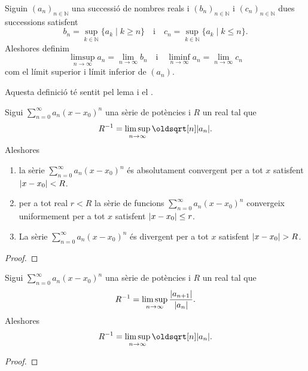 \documentclass[../Apunts.tex]{subfiles}
\begin{document}
	\begin{definition}
		\label{def:límit superior d'una successió}
		\label{def:límit inferior d'una successió}
		Siguin \((a_{n})_{n\in\mathbb{N}}\) una successió de nombres reals i \((b_{n})_{n\in\mathbb{N}}\) i \((c_{n})_{n\in\mathbb{N}}\) dues successions satisfent
		\[b_{n}=\sup_{k\in\mathbb{N}}\{a_{k}\mid k\geq n\}\quad\text{i}\quad c_{n}=\sup_{k\in\mathbb{N}}\{a_{k}\mid k\leq n\}.\]
		Aleshores definim
		\[\limsup_{n\to\infty}a_{n}=\lim_{n\to\infty}b_{n}\quad\text{i}\quad\liminf_{n\to\infty}a_{n}=\lim_{n\to\infty}c_{n}\]
		com el límit superior i límit inferior de \((a_{n})\).
		
		Aquesta definició té sentit pel lema  i el \corollari{} .
	\end{definition}
	\begin{theorem}
		\label{thm:radi de convergència d'una sèrie de potències}
		Sigui \(\sum_{n=0}^{\infty}a_{n}(x-x_{0})^{n}\) una sèrie de potències i \(R\) un real tal que
		\[R^{-1}=\limsup_{n\to\infty}\sqrt[n]{\abs{a_{n}}}.\]
		Aleshores
		\begin{enumerate}
			\item\label{thm:radi de convergència d'una sèrie de potències:enum1} la sèrie \(\sum_{n=0}^{\infty}a_{n}(x-x_{0})^{n}\) és absolutament convergent per a tot \(x\) satisfent \(\abs{x-x_{0}}<R\).
			\item\label{thm:radi de convergència d'una sèrie de potències:enum2} per a tot real \(r<R\) la sèrie de funcions \(\sum_{n=0}^{\infty}a_{n}(x-x_{0})^{n}\) convergeix uniformement per a tot \(x\) satisfent \(\abs{x-x_{0}}\leq r\).
			\item\label{thm:radi de convergència d'una sèrie de potències:enum3} La sèrie \(\sum_{n=0}^{\infty}a_{n}(x-x_{0})^{n}\) és divergent per a tot \(x\) satisfent \(\abs{x-x_{0}}>R\).
		\end{enumerate}
		\begin{proof}
		\end{proof}
	\end{theorem}
	\begin{proposition}
		\label{prop:quocient per calcular radis de convergència de sèries de potències}
		Sigui \(\sum_{n=0}^{\infty}a_{n}(x-x_{0})^{n}\) una sèrie de potències i \(R\) un real tal que
		\[R^{-1}=\limsup_{n\to\infty}\frac{\abs{a_{n+1}}}{\abs{a_{n}}}.\]
		Aleshores
		\[R^{-1}=\limsup_{n\to\infty}\sqrt[n]{\abs{a_{n}}}.\]
		\begin{proof}
		\end{proof}
	\end{proposition}
\end{document}
